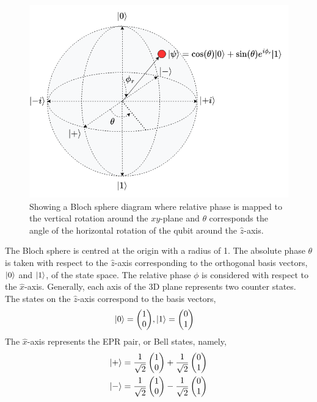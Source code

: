 \begin{figure}
	\centering
	\includegraphics[width=0.80\linewidth]{body/ch2/figs/blochsphere}
	\caption[Bloch sphere diagram representing the quantum state of a qubit as a vector in Hilbert space.]{Showing a Bloch sphere diagram where relative phase is mapped to the vertical rotation around the $xy$-plane and $\theta$ corresponds the angle of the horizontal rotation of the qubit around the $\hat{z}$-axis.}
	\label{fig:blochsphere}
\end{figure}
The Bloch sphere is centred at the origin with a radius of 1. The absolute phase $\theta$ is taken with respect to the $\hat{z}$-axis corresponding to the orthogonal basis vectors, $\ket{0}$ and $\ket{1}$, of the state space. The relative phase $\phi$ is considered with respect to the $\hat{x}$-axis. Generally, each axis of the 3D plane represents two counter states. The states on the $\hat{z}$-axis correspond to the basis vectors,
\begin{align}
	\ket{0}	= \left(\begin{matrix}
		1\\
		0
	\end{matrix}\right) &, 	\ket{1}	= \left(\begin{matrix}
	0\\
	1
\end{matrix}\right)\nonumber
\end{align}
The $\hat{x}$-axis represents the EPR pair, or Bell states, namely,
\begin{align}
		\ket{+}	& = 
		\frac{1}{\sqrt{2}}\left(\begin{matrix}
										1\\
										0
								\end{matrix}\right) + 
		\frac{1}{\sqrt{2}}\left(\begin{matrix}
										0\\
										1
								\end{matrix}\right)\nonumber\\
		\ket{-}	& = 
		\frac{1}{\sqrt{2}}\left(\begin{matrix}
										1\\
										0
								\end{matrix}\right) - 
		\frac{1}{\sqrt{2}}\left(\begin{matrix}
										0\\
										1
								\end{matrix}\right)\nonumber
\end{align}

